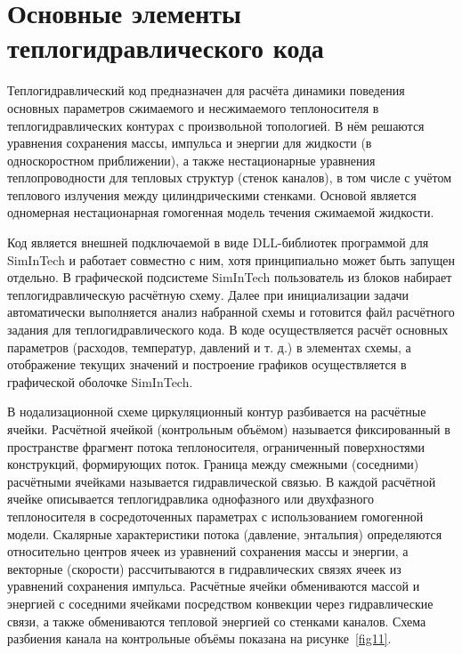 
\section{Основные элементы теплогидравлического кода}
\label{sec:section1}
Теплогидравлический код предназначен для расчёта динамики поведения основных параметров сжимаемого и несжимаемого теплоносителя в теплогидравлических контурах с произвольной топологией. В нём решаются уравнения сохранения массы, импульса и энергии для жидкости (в односкоростном приближении), а также нестационарные уравнения теплопроводности для тепловых структур (стенок каналов), в том числе с учётом теплового излучения между цилиндрическими стенками. Основой является одномерная нестационарная гомогенная модель течения сжимаемой жидкости. 

Код является внешней подключаемой в виде DLL-библиотек программой для Sim\-In\-Tech и работает совместно с ним, хотя принципиально может быть запущен отдельно. В графической подсистеме SimInTech пользователь из блоков набирает теплогидравлическую расчётную схему. Далее при инициализации задачи автоматически выполняется анализ набранной схемы и готовится файл расчётного задания для теплогидравлического кода. В коде осуществляется расчёт основных параметров (расходов, температур, давлений и т. д.) в элементах схемы, а отображение текущих значений и построение графиков осуществляется в графической оболочке SimInTech. 

В нодализационной схеме циркуляционный контур разбивается на расчётные ячейки. Расчётной ячейкой (контрольным объёмом) называется фиксированный в пространстве фрагмент потока теплоносителя, ограниченный поверхностями конструкций, формирующих поток. Граница между смежными (соседними) расчётными ячейками называется гидравлической связью. В каждой расчётной ячейке описывается теплогидравлика однофазного или двухфазного теплоносителя в сосредоточенных параметрах с использованием гомогенной модели. Скалярные характеристики потока (давление, энтальпия) определяются относительно центров ячеек из уравнений сохранения массы и энергии, а векторные (скорости) рассчитываются в гидравлических связях ячеек из уравнений сохранения импульса. Расчётные ячейки обмениваются массой и энергией с соседними ячейками посредством конвекции через гидравлические связи, а также обмениваются тепловой энергией со стенками каналов. Схема разбиения канала на контрольные объёмы показана на рисунке~\ref{fig11}.

\begin{figure}[ht]
\abovecaptionskip=2pt
\end{figure}

